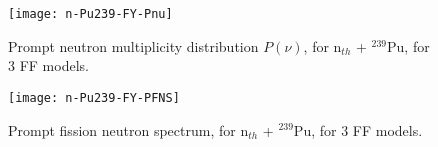 \begin{figure}
\centering\texttt{[image: n-Pu239-FY-Pnu]}
\caption{Prompt neutron multiplicity distribution $P(\nu )$, for n$_{th}$ + $^{239}$Pu, for 3 FF models.}
\label{n-Pu239-FY-Pnu}
\end{figure}
\begin{figure}
\centering\texttt{[image: n-Pu239-FY-PFNS]}
\caption{Prompt fission neutron spectrum, for n$_{th}$ + $^{239}$Pu, for 3 FF models.}
\label{n-Pu239-FY-PFNS}
\end{figure}
